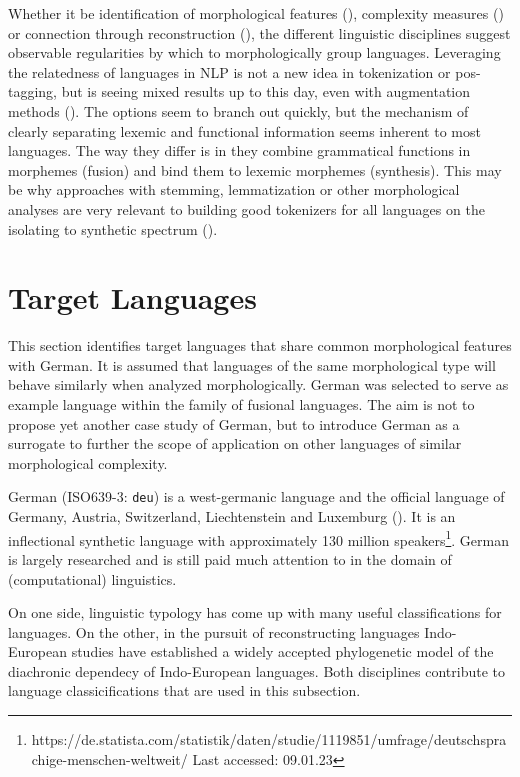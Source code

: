 Whether it be identification of morphological features (\cite[42--56]{comrie1989}), complexity measures (\cite{measuresofMC}) or connection through reconstruction (\cite{INDOEUROPE}),
the different linguistic disciplines suggest observable regularities by which to morphologically group languages.
Leveraging the relatedness of languages in NLP is not a new idea in tokenization or \ac{pos}\hyphen tagging, but is seeing mixed results up to this day, even with augmentation methods (\cite{mixednoiseinterlanguage}).
The options seem to branch out quickly, but the mechanism of clearly separating lexemic and functional information seems inherent to most languages.
The way they differ is in they combine grammatical functions in morphemes (fusion) and bind them to lexemic morphemes (synthesis).
This may be why approaches with stemming, lemmatization or other morphological analyses are very relevant to building good tokenizers for all languages on the isolating to synthetic spectrum (\cite[51--53]{POLYSYNTHLM}).


\section{Target Languages}
\label{sec:target-languages}
This section identifies target languages that share common morphological features with German.
It is assumed that languages of the same morphological type will behave similarly when analyzed morphologically.
German was selected to serve as example language within the family of fusional languages.
The aim is not to propose yet another case study of German, but to introduce German as a surrogate to further the scope of application on other languages of similar morphological complexity.

German (ISO639-3: \texttt{deu}) is a west-germanic language and the official language of Germany, Austria, Switzerland, Liechtenstein and Luxemburg (\cite{METZLER2016}).
It is an inflectional synthetic language with approximately 130 million speakers\footnote{https://de.statista.com/statistik/daten/studie/1119851/umfrage/deutschsprachige-menschen-weltweit/ Last accessed: 09.01.23}.
German is largely researched and is still paid much attention to in the domain of (computational) linguistics.


On one side, linguistic typology has come up with many useful classifications for languages.
On the other, in the pursuit of reconstructing languages Indo-European studies have established a widely accepted phylogenetic model of the diachronic dependecy of Indo-European languages.
Both disciplines contribute to language classicifications that are used in this subsection.

